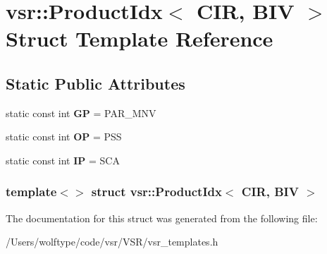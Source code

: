 \hypertarget{structvsr_1_1_product_idx_3_01_c_i_r_00_01_b_i_v_01_4}{\section{vsr\-:\-:Product\-Idx$<$ C\-I\-R, B\-I\-V $>$ Struct Template Reference}
\label{structvsr_1_1_product_idx_3_01_c_i_r_00_01_b_i_v_01_4}
}
\subsection*{Static Public Attributes}
\begin{DoxyCompactItemize}
\item 
\hypertarget{structvsr_1_1_product_idx_3_01_c_i_r_00_01_b_i_v_01_4_a133397a24e2e68c9ea953bc90f753401}{static const int {\bfseries G\-P} = P\-A\-R\-\_\-\-M\-N\-V}\label{structvsr_1_1_product_idx_3_01_c_i_r_00_01_b_i_v_01_4_a133397a24e2e68c9ea953bc90f753401}

\item 
\hypertarget{structvsr_1_1_product_idx_3_01_c_i_r_00_01_b_i_v_01_4_afffda4acc76002a3e0bc78ad4441f066}{static const int {\bfseries O\-P} = P\-S\-S}\label{structvsr_1_1_product_idx_3_01_c_i_r_00_01_b_i_v_01_4_afffda4acc76002a3e0bc78ad4441f066}

\item 
\hypertarget{structvsr_1_1_product_idx_3_01_c_i_r_00_01_b_i_v_01_4_af0e8344ca2782841bdf4c72887c70852}{static const int {\bfseries I\-P} = S\-C\-A}\label{structvsr_1_1_product_idx_3_01_c_i_r_00_01_b_i_v_01_4_af0e8344ca2782841bdf4c72887c70852}

\end{DoxyCompactItemize}
\subsubsection*{template$<$$>$ struct vsr\-::\-Product\-Idx$<$ C\-I\-R, B\-I\-V $>$}



The documentation for this struct was generated from the following file\-:\begin{DoxyCompactItemize}
\item 
/\-Users/wolftype/code/vsr/\-V\-S\-R/vsr\-\_\-templates.\-h\end{DoxyCompactItemize}
